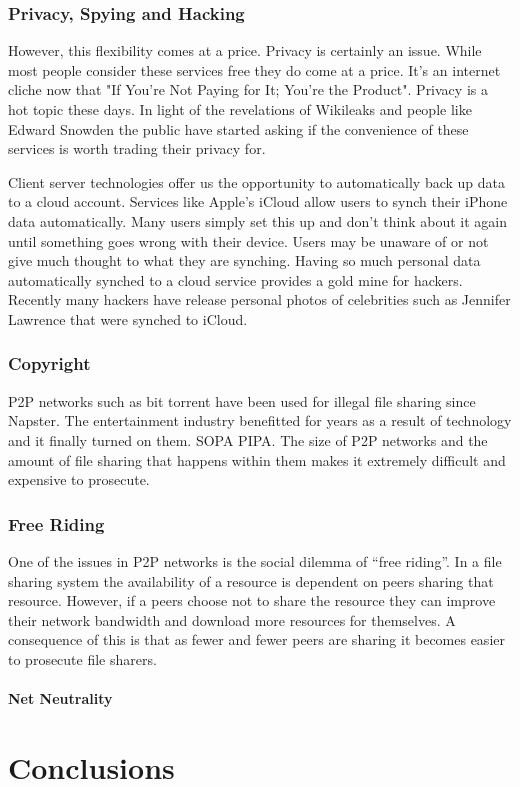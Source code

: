 \documentclass[11pt]{amsart}
\begin{document}
\section{Privacy, Spying and Hacking}

However, this flexibility comes at a price. Privacy is certainly an issue. While most people consider these services free they do come at a price. It's an internet cliche now that "If You're Not Paying for It; You're the Product". Privacy is a hot topic these days. In light of the revelations of Wikileaks and people like Edward Snowden the public have started asking if the convenience of these services is worth trading their privacy for.

Client server technologies offer us the opportunity to automatically back up data to a cloud account. Services like Apple's iCloud allow users to synch their iPhone data automatically. Many users simply set this up and don't think about it again until something goes wrong with their device. Users may be unaware of or not give much thought to what they are synching. Having so much personal data automatically synched to a cloud service provides a gold mine for hackers. Recently many hackers have release personal photos of celebrities such as Jennifer Lawrence that were synched to iCloud.

\section{Copyright}

P2P networks such as bit torrent have been used for illegal file sharing since Napster. The entertainment industry benefitted for years as a result of technology and it finally turned on them. SOPA PIPA. The size of P2P networks and the amount of file sharing that happens within them makes it extremely difficult and expensive to prosecute.

\section{Free Riding}\cite{FreeRiding}

One of the issues in P2P networks is the social dilemma of ``free riding''. In a file sharing system the availability of a resource is dependent on peers sharing that resource. However, if a peers choose not to share the resource they can improve their network bandwidth and download more resources for themselves. A consequence of this is that as fewer and fewer peers are sharing it becomes easier to prosecute file sharers. 

\subsection{Net Neutrality}

\part{Conclusions}






\end{document}

